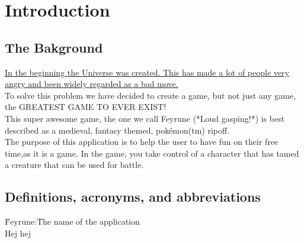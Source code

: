 \section{Introduction}

\begin{comment}
Give some background and explain the purpose of this application. Describe
the functionality of the application. Describe the stakeholders of the project,
highlight who will benefit from/use this particular application.
\end{comment}
\subsection{The Bakground}
\href{https://www.amazon.com/Restaurant-at-End-Universe/dp/0345391810}{
	In the beginning the Universe was created. This has made a lot of people very angry and been widely regarded as a bad move.}\\
To solve this problem we have decided to create a game, but not just any game, the GREATEST GAME TO EVER EXIST!\\
This super awesome game, the one we call Feyrune (*Loud gasping!*) is best described as a medieval, fantasy themed, pokémon(tm) ripoff.\\
The purpose of this application is to help the user to have fun on their free time,as it is a game. In the game, you take control of a character that has tamed a creature that can be used for battle.


\subsection{Definitions, acronyms, and abbreviations}
\begin{comment}
Create a word list to avoid confusion and give a definition of every abbreviation
you use in the document.
\end{comment}
\label{wordlist}
\begin{tabbing}
	\indent\= Feyrune:\indent\indent\= The name of the application\\
	\> Hej\> hej
\end{tabbing}
